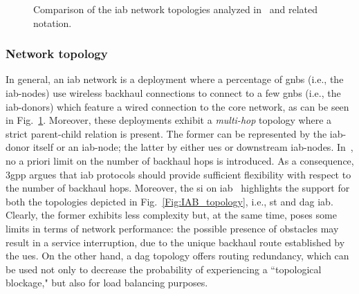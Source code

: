 \begin{figure}[t!]
	\centering
  	\hfill
    \caption{Comparison of the \gls{iab} network topologies analyzed in~\cite{3gpp_38_874} and related notation.}
    \label{Fig:IAB_top_not}
\end{figure}

\subsubsection{Network topology}
In general, an \gls{iab} network is a deployment where a percentage of \glspl{gnb} (i.e., the \gls{iab}-nodes) use wireless backhaul connections to connect to a few \glspl{gnb} (i.e., the \gls{iab}-donors) which feature a wired connection to the core network, as can be seen in Fig.~\ref{Fig:IAB_top_not}.
Moreover, these deployments exhibit a \textit{multi-hop} topology where a strict parent-child relation is present. The former can be represented by the \gls{iab}-donor itself or an \gls{iab}-node; the latter by either \gls{ue}s or downstream \gls{iab}-nodes. In~\cite{3gpp_38_874}, no a priori limit on the number of backhaul hops is introduced. As a consequence, \gls{3gpp} argues that \gls{iab} protocols should provide sufficient flexibility with respect to the number of backhaul hops. 
Moreover, the \gls{si} on \gls{iab}~\cite{3gpp_38_874} highlights the support for both the topologies depicted in Fig.~\ref{Fig:IAB_topology}, i.e., \gls{st} and \gls{dag} \gls{iab}. Clearly, the former exhibits less complexity but, at the same time, poses some limits in terms of network performance: the possible presence of obstacles may result in a service interruption, due to the unique backhaul route established by the \glspl{ue}. 
On the other hand, a \gls{dag} topology offers routing redundancy, which can be used not only to decrease the probability of experiencing a ``topological blockage," but also for load balancing purposes.

